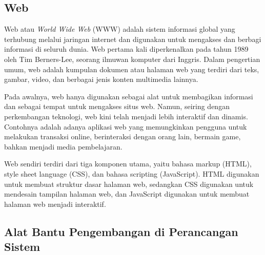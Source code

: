 \subsection{Web}
Web atau \textit{World Wide Web} (WWW) adalah sistem informasi global yang terhubung melalui jaringan internet dan digunakan untuk mengakses dan berbagi informasi di seluruh dunia. Web pertama kali diperkenalkan pada tahun 1989 oleh Tim Berners-Lee, seorang ilmuwan komputer dari Inggris. Dalam pengertian umum, web adalah kumpulan dokumen atau halaman web yang terdiri dari teks, gambar, video, dan berbagai jenis konten multimedia lainnya.

Pada awalnya, web hanya digunakan sebagai alat untuk membagikan informasi dan sebagai tempat untuk mengakses situs web. Namun, seiring dengan perkembangan teknologi, web kini telah menjadi lebih interaktif dan dinamis. Contohnya adalah adanya aplikasi web yang memungkinkan pengguna untuk melakukan transaksi online, berinteraksi dengan orang lain, bermain game, bahkan menjadi media pembelajaran.

Web sendiri terdiri dari tiga komponen utama, yaitu bahasa markup (HTML), style sheet language (CSS), dan bahasa scripting (JavaScript). HTML digunakan untuk membuat struktur dasar halaman web, sedangkan CSS digunakan untuk mendesain tampilan halaman web, dan JavaScript digunakan untuk membuat halaman web menjadi interaktif.

\subsection{Alat Bantu Pengembangan di Perancangan Sistem}

